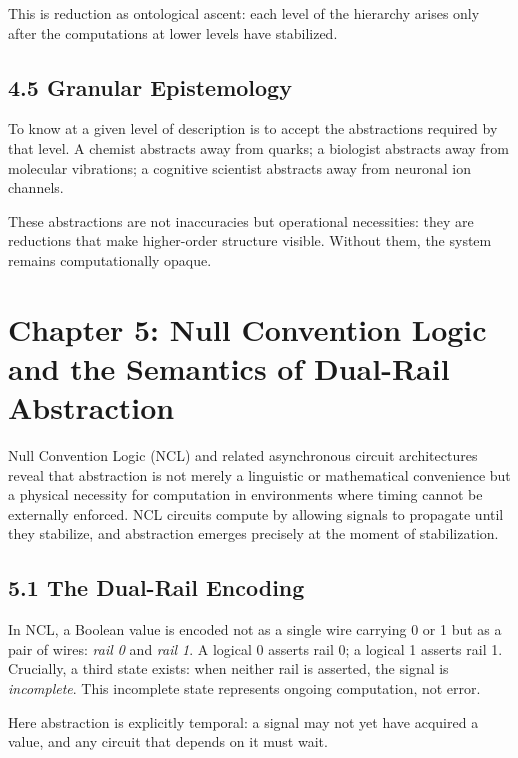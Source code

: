 \documentclass[12pt,letterpaper]{article}
\begin{document}
This is reduction as ontological ascent: each level of the hierarchy arises only after the computations at lower levels have stabilized.

\subsection{4.5 Granular Epistemology}

To know at a given level of description is to accept the abstractions required by that level. A chemist abstracts away from quarks; a biologist abstracts away from molecular vibrations; a cognitive scientist abstracts away from neuronal ion channels.

These abstractions are not inaccuracies but operational necessities: they are reductions that make higher-order structure visible. Without them, the system remains computationally opaque.

\newpage

\section{Chapter 5: Null Convention Logic and the Semantics of Dual-Rail Abstraction}

Null Convention Logic (NCL) and related asynchronous circuit architectures reveal that abstraction is not merely a linguistic or mathematical convenience but a physical necessity for computation in environments where timing cannot be externally enforced. NCL circuits compute by allowing signals to propagate until they stabilize, and abstraction emerges precisely at the moment of stabilization.

\subsection{5.1 The Dual-Rail Encoding}

In NCL, a Boolean value is encoded not as a single wire carrying 0 or 1 but as a pair of wires: \emph{rail 0} and \emph{rail 1}. A logical 0 asserts rail 0; a logical 1 asserts rail 1. Crucially, a third state exists: when neither rail is asserted, the signal is \emph{incomplete}. This incomplete state represents ongoing computation, not error.

Here abstraction is explicitly temporal: a signal may not yet have acquired a value, and any circuit that depends on it must wait.
\end{document}
